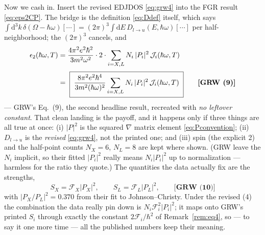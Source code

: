 \documentclass[11pt,a4paper]{article}
\numberwithin{equation}{section}
\newcommand{\hw}{\hbar\omega}
\newcommand{\cF}{\mathcal{F}}
\newcommand{\cJ}{\mathcal{J}}%
\newcommand{\dd}{\mathrm{d}}
\newcommand{\grweq}[1]{\textbf{[GRW~(#1)]}}
\begin{document}
Now we cash in. Insert the revised EDJDOS \eqref{eq:grw4} into the
FGR result \eqref{eq:eps2CP}. The bridge is the definition
\eqref{eq:Ddef} itself, which says
$\int\dd^3k\,\delta(\Omega-\hw)[\cdots]
=(2\pi)^3\!\int\!\dd E\,D_{l\to u}(E,\hw)[\cdots]$ per
half-neighborhood; the $(2\pi)^3$ cancels, and
\begin{align}
\epsilon_2(\hw,T)
&=\frac{4\pi^2e^2\hbar^2}{3m^2\omega^2}\cdot2\cdot
\sum_{i=X,L}N_i\,|P_i|^2\,\cJ_i(\hw,T)
\notag\\[2pt]
&=\;
\boxed{\;
\frac{8\pi^2e^2\hbar^4}{3m^2(\hw)^2}
\sum_{i=X,L}N_i\,|P_i|^2\,\cJ_i(\hw,T)
\;}\qquad\grweq{9}
\label{eq:grw9}
\end{align}
--- GRW's Eq.~(9), the second headline result, recreated with
\emph{no leftover constant}. That clean landing is the payoff, and it
happens only if three things are all true at once: (i) $|P|^2$ is the
squared $\nabla$ matrix element \eqref{eq:Pconvention}; (ii)
$D_{l\to u}$ is the \emph{revised} \eqref{eq:grw4}, not the printed
one; and (iii) spin (the explicit 2) and the half-point counts
$N_X=6$, $N_L=8$ are kept where shown. (GRW leave the $N_i$ implicit,
so their fitted $|P_i|^2$ really means $N_i|P_i|^2$ up to
normalization --- harmless for the ratio they quote.) The quantities
the data actually fix are the strengths,
\begin{equation}
S_X=\cF_X|P_X|^2,\qquad S_L=\cF_L|P_L|^2,
\qquad\grweq{10}
\label{eq:grw10}
\end{equation}
with $|P_X/P_L|^2=0.370$ from their fit to Johnson--Christy. Under the
revised (4) the combination the data really pin down is
$N_i\cF_i^2|P_i|^2$; it maps onto GRW's printed $S_i$ through exactly
the constant $2\cF_i/\hbar^2$ of Remark~\ref{rem:eq4}, so --- to say it
one more time --- all the published numbers keep their meaning.
\end{document}
